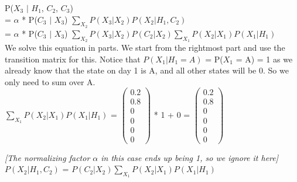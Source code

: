 \documentclass{article}
\begin{document}
P($X_{3}$ $\vert$ $H_{1}$, $C_{2}$, $C_{3}$) \\ 
\indent 
= $\alpha$ * P($C_{3}$ $\vert$ $X_{3}$) $\sum_{X_2}P(X_{3} \vert X_{2}) P(X_2 \vert H_{1}, C_{2})$\\ 
\indent 
= $\alpha$ * P($C_{3}$ $\vert$ $X_{3}$) $\sum_{X_2}P(X_{3} \vert X_{2}) P(C_{2} \vert X_2)\sum_{X_1}P(X_{2} \vert X_{1})P(X_1 \vert H_1)$ \\ 

\noindent 
We solve this equation in parts. We start from the rightmost part and use the transition matrix for this. Notice that $P(X_1 \vert H_1 = A)$ = P($X_1$ = A) = 1 as we already know that the state on day 1 is A, and all other states will be 0. So we only need to sum over A.\\

\noindent
$\sum_{X_1}P(X_{2} \vert X_{1})P(X_1 \vert H_1)$ =
$\left(\begin{array}{c} 
    0.2 \\ 
    0.8 \\ 
    0 \\ 
    0 \\ 
    0 \\
    0
    \end{array}\right)$ * 1 + 0 = 
$\left(\begin{array}{c} 
        0.2 \\
        0.8 \\ 
        0 \\
        0 \\
        0 \\
        0
    \end{array}\right)$

\noindent
\textit{[The normalizing factor $\alpha$ in this case ends up being 1, so we ignore it here]}\\ 

\noindent 
$P(X_2 \vert H_{1}, C_{2})$ = $P(C_{2} \vert X_2)\sum_{X_1}P(X_{2} \vert X_{1})P(X_1 \vert H_1)$\\ 
\end{document}
